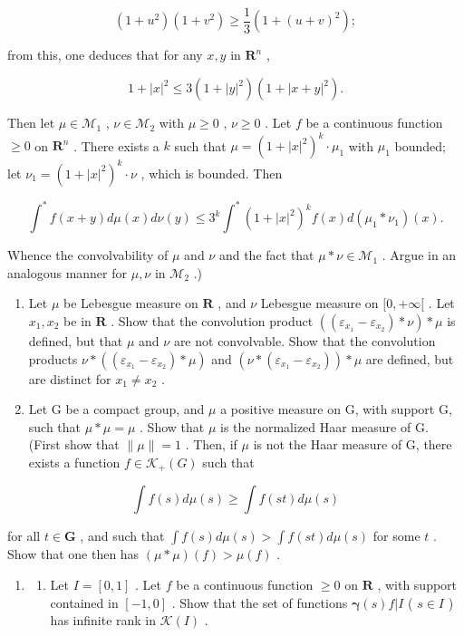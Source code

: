 \[
(1 + u ^ {2}) (1 + v ^ {2}) \geqslant \frac {1}{3} (1 + (u + v) ^ {2});
\]

from this, one deduces that for any \(x, y\) in \(\mathbf{R}^n\) ,

\[
1 + | x | ^ {2} \leqslant 3 (1 + | y | ^ {2}) (1 + | x + y | ^ {2}).
\]

Then let \(\mu \in \mathcal{M}_1\) , \(\nu \in \mathcal{M}_2\) with \(\mu \geqslant 0\) , \(\nu \geqslant 0\) . Let \(f\) be a continuous function \(\geqslant 0\) on \(\mathbf{R}^n\) . There exists a \(k\) such that \(\mu = (1 + |x|^2)^k \cdot \mu_1\) with \(\mu_1\) bounded; let \(\nu_1 = (1 + |x|^2)^k \cdot \nu\) , which is bounded. Then

\[
\int^ {*} f (x + y) d \mu (x) d \nu (y) \leqslant 3 ^ {k} \int^ {*} (1 + | x | ^ {2}) ^ {k} f (x) d (\mu_ {1} * \nu_ {1}) (x).
\]

Whence the convolvability of \(\mu\) and \(\nu\) and the fact that \(\mu * \nu \in \mathcal{M}_1\) . Argue in an analogous manner for \(\mu, \nu\) in \(\mathcal{M}_2\) .)

\begin{enumerate}
\def\labelenumi{\arabic{enumi})}
\setcounter{enumi}{3}
\item
  Let \(\mu\) be Lebesgue measure on \(\mathbf{R}\) , and \(\nu\) Lebesgue measure on \([0, +\infty[\) . Let \(x_1, x_2\) be in \(\mathbf{R}\) . Show that the convolution product \(((\varepsilon_{x_1} - \varepsilon_{x_2}) * \nu) * \mu\) is defined, but that \(\mu\) and \(\nu\) are not convolvable. Show that the convolution products \(\nu * ((\varepsilon_{x_1} - \varepsilon_{x_2}) * \mu)\) and \((\nu * (\varepsilon_{x_1} - \varepsilon_{x_2})) * \mu\) are defined, but are distinct for \(x_1 \neq x_2\) .
\item
  Let G be a compact group, and \(\mu\) a positive measure on G, with support G, such that \(\mu*\mu=\mu\) . Show that \(\mu\) is the normalized Haar measure of G. (First show that \(\|\mu\|=1\) . Then, if \(\mu\) is not the Haar measure of G, there exists a function \(f\in\mathcal{K}_{+}(G)\) such that
\end{enumerate}

\[
\int f (s) d \mu (s) \geqslant \int f (s t) d \mu (s)
\]

for all \(t \in \mathbf{G}\) , and such that \(\int f(s) d\mu(s) > \int f(st) d\mu(s)\) for some \(t\) . Show that one then has \((\mu * \mu)(f) > \mu(f)\) .

\begin{enumerate}
\def\labelenumi{\arabic{enumi})}
\setcounter{enumi}{5}
\tightlist
\item
  \begin{enumerate}
  \def\labelenumii{\alph{enumii})}
  \tightlist
  \item
    Let \(I = [0,1]\) . Let \(f\) be a continuous function \(\geqslant 0\) on \(\mathbf{R}\) , with support contained in \([-1,0]\) . Show that the set of functions \(\pmb{\gamma}(s)f|I\) ( \(s \in I\) ) has infinite rank in \(\mathcal{K}(I)\) .
  \end{enumerate}
\end{enumerate}

